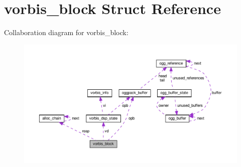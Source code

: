 \hypertarget{structvorbis__block}{}\section{vorbis\+\_\+block Struct Reference}
\label{structvorbis__block}


Collaboration diagram for vorbis\+\_\+block\+:
\nopagebreak
\begin{figure}[H]
\begin{center}
\leavevmode
\includegraphics[width=350pt]{structvorbis__block__coll__graph}
\end{center}
\end{figure}

